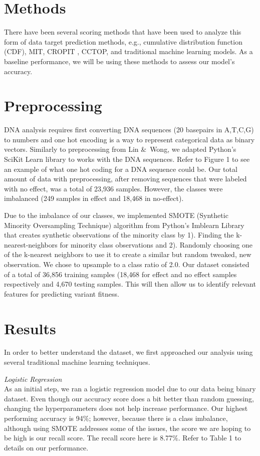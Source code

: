\documentclass[10pt,twocolumn,letterpaper]{article}
\begin{document}
\section*{Methods}
There have been several scoring methods that have been used to analyze this form of data target prediction methods, e.g., cumulative distribution function (CDF), MIT, CROPIT , CCTOP, and traditional machine learning models. As a baseline performance,  we will be using these methods to assess our model's accuracy. 
\section*{Preprocessing}
DNA analysis requires first converting DNA sequences (20 basepairs in {A,T,C,G}) to numbers and one hot encoding is a way to represent categorical data as binary vectors. Similarly to preprocessing from Lin \&\ Wong, we adapted Python's SciKit Learn library to works with the DNA sequences. Refer to Figure 1 to see an example of what one hot coding for a DNA sequence could be. Our total amount of data with preprocessing, after removing sequences that were labeled with no effect, was a total of 23,936 samples. However, the classes were imbalanced (249 samples in effect and 18,468 in no-effect). 

Due to the imbalance of our classes, we implemented SMOTE (Synthetic Minority Oversampling Technique) algorithm from Python’s Imblearn Library that creates synthetic observations of the minority class by 1). Finding the k-nearest-neighbors for minority class observations and 2). Randomly choosing one of the k-nearest neighbors to use it to create a similar but random tweaked, new observation. We chose to upsample to a class ratio of 2.0. Our dataset consisted of a total of 36,856 training samples (18,468 for effect and no effect samples respectively and 4,670 testing samples. This will then allow us to identify relevant features for predicting variant fitness. 
\section*{Results}
In order to better understand the dataset, we first approached our analysis using several traditional machine learning techniques. 

\textit{Logistic Regression \\}
As an initial step, we ran a logistic regression model due to our data being binary dataset. Even though our accuracy score does a bit better than random guessing, changing the hyperparameters does not help increase performance.  Our highest performing accuracy is  94$\%$; however, because there is a class imbalance, although using SMOTE addresses some of the issues, the score we are hoping to be high is our recall score. The recall score here is 8.77$\%$. Refer to Table 1 to details on our performance. 
\end{document}
